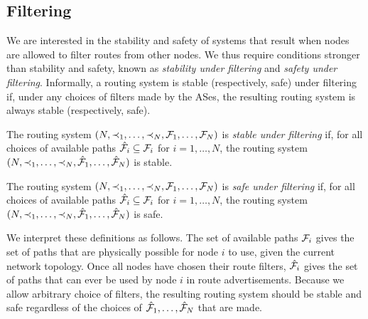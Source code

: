 %
%

\subsection{Filtering}

We are interested in the stability and safety of systems
that result when nodes are allowed to filter routes from other nodes.
We thus require conditions stronger than stability and safety, known as
{\em stability under filtering} and {\em safety under filtering}.
Informally, a routing system is stable (respectively, safe) under
filtering if, under any choices of filters made by the ASes, the
resulting routing system is always stable (respectively, safe).  

\begin{defn}
The routing system $(N, \prec_1, \ldots, \prec_N, \mathcal{F}_1, \ldots, \mathcal{F}_N)$
is {\em stable under filtering} if, for all choices of available paths
$\hat{\mathcal{F}}_i \subseteq \mathcal{F}_i$ for $i = 1,\ldots,N$, the routing system
$(N, \prec_1, \ldots, \prec_N, \hat{\mathcal{F}}_1, \ldots, \hat{\mathcal{F}}_N)$ is
stable.
\end{defn} 

\begin{defn}
The routing system $(N, \prec_1, \ldots, \prec_N, \mathcal{F}_1, \ldots, \mathcal{F}_N)$
is {\em safe under filtering} if, for all choices of available paths
$\hat{\mathcal{F}}_i \subseteq \mathcal{F}_i$ for $i = 1,\ldots,N$, the routing system
$(N, \prec_1, \ldots, \prec_N, \hat{\mathcal{F}}_1, \ldots, \hat{\mathcal{F}}_N)$ is
safe.
\end{defn} 

We interpret these definitions as follows.  The set of available paths
$\mathcal{F}_i$ gives the set of paths that are physically possible for node $i$ to
use, given the current network topology.  Once all nodes have chosen
their route filters, 
$\hat{\mathcal{F}}_i$ gives the set of paths that can ever be used by node $i$ in
route advertisements.  Because we allow arbitrary choice of filters, the
resulting routing system should be stable and safe regardless of the
choices of $\hat{\mathcal{F}}_1, \ldots, \hat{\mathcal{F}}_N$ that are made.



